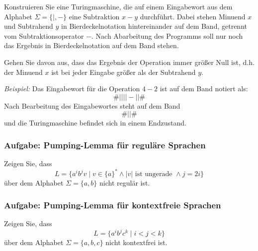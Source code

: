 \documentclass[a4paper,14pt,ngerman]{scrartcl}
\begin{document}
Konstruieren Sie eine Turingmaschine, die auf einem Eingabewort aus dem
Alphabet \(\Sigma = \{|, -\}\) eine Subtraktion \(x-y\) durchführt.
Dabei stehen Minuend \(x\) und Subtrahend \(y\) in Bierdeckelnotation
hintereinander auf dem Band, getrennt vom Subtraktionsoperator \(-\).
Nach Abarbeitung des Programms soll nur noch das Ergebnis in
Bierdeckelnotation auf dem Band stehen.

Gehen Sie davon aus, dass das Ergebnis der Operation immer größer Null
ist, d.h. der Minuend \(x\) ist bei jeder Eingabe größer als der
Subtrahend \(y\).

\emph{Beispiel:} Das Eingabewort für die Operation \(4-2\) ist auf dem Band
notiert als: \[\#||||-||\#\] Nach Bearbeitung des Eingabewortes steht
auf dem Band \[\#||\#\] und die Turingmaschine befindet sich in einem
Endzustand.
\subsubsection{\textbf{Aufgabe: Pumping-Lemma für reguläre Sprachen}}
\label{sec:orge6db03b}

Zeigen Sie, dass
\[L=\{a^ib^jv \mid v \in \{a\}^* \land |v| \textrm{ ist ungerade } \land j=2i\}\]
über dem Alphabet \(\Sigma=\{a,b\}\) nicht regulär ist.
\subsubsection{\textbf{Aufgabe: Pumping-Lemma für kontextfreie Sprachen}}
\label{sec:org56bf883}

Zeigen Sie, dass \[L=\{a^ib^jc^k \mid i<j<k\}\] über dem Alphabet
\(\Sigma=\{a,b,c\}\) nicht kontextfrei ist.
\end{document}
